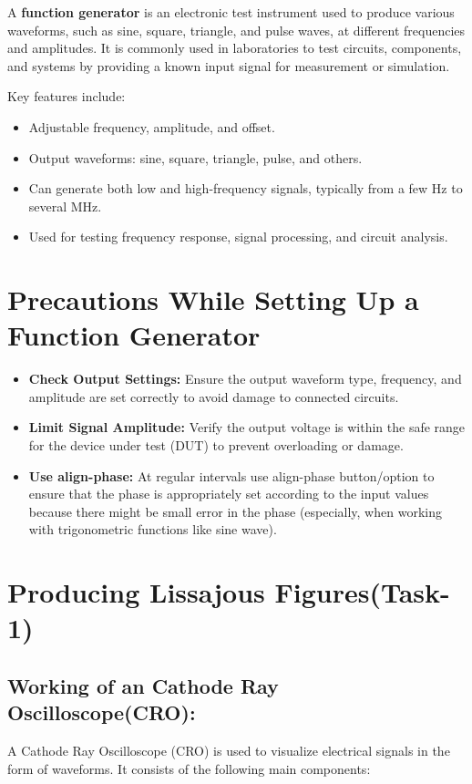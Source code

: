 \documentclass[12pt]{article}
\begin{document}
A \textbf{function generator} is an electronic test instrument used to produce various waveforms, such as sine, square, triangle, and pulse waves, at different frequencies and amplitudes. It is commonly used in laboratories to test circuits, components, and systems by providing a known input signal for measurement or simulation. 

Key features include:
\begin{itemize}
    \item Adjustable frequency, amplitude, and offset.
    \item Output waveforms: sine, square, triangle, pulse, and others.
    \item Can generate both low and high-frequency signals, typically from a few Hz to several MHz.
    \item Used for testing frequency response, signal processing, and circuit analysis.
\end{itemize}
\section{Precautions While Setting Up a Function Generator}

\begin{itemize}
    \item \textbf{Check Output Settings:} Ensure the output waveform type, frequency, and amplitude are set correctly to avoid damage to connected circuits.
    \item \textbf{Limit Signal Amplitude:} Verify the output voltage is within the safe range for the device under test (DUT) to prevent overloading or damage.
    \item \textbf{Use align-phase:} At regular intervals use align-phase button/option to ensure that the phase is appropriately set according to the input values because there might be small error in the phase (especially, when working with trigonometric functions like sine wave).
\end{itemize}
\section{Producing Lissajous Figures(Task-1)}
\subsection{Working of an Cathode Ray Oscilloscope(CRO): }
A Cathode Ray Oscilloscope (CRO) is used to visualize electrical signals in the form of waveforms. It consists of the following main components:
\end{document}
